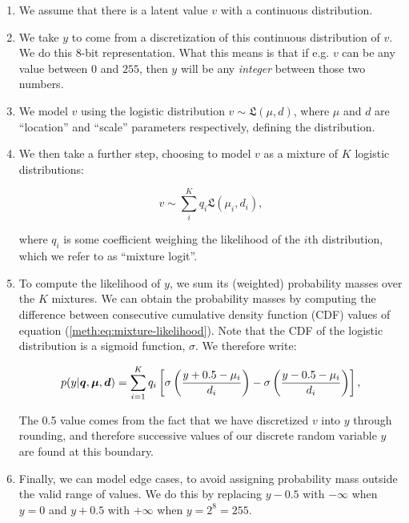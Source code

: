 \documentclass[../main.tex]{subfiles}
\begin{document}
\begin{enumerate}

	\item We assume that there is a latent value $v$ with a continuous distribution.

	\item We take $y$ to come from a discretization of this continuous distribution of $v$. We do this
	      8-bit representation. What this means is that if e.g. $v$ can be any value between $0$ and
	      $255$, then $y$ will be any \emph{integer} between those two numbers.

	\item We model $v$ using the logistic distribution $v \sim \mathfrak{L}(\mu, d)$, where $\mu$
	      and $d$ are ``location'' and ``scale'' parameters respectively, defining the distribution.

	\item We then take a further step, choosing to model $v$ as a mixture of $K$ logistic
	      distributions:

	      \begin{equation}\label{meth:eq:mixture-likelihood}
		      v \sim \sum_i^K q_i \mathfrak{L}(\mu_i, d_i),
	      \end{equation}

	      where $q_i$ is some coefficient weighing the likelihood of the $i$th distribution, which we
	      refer to as ``mixture logit''.

	\item To compute the likelihood of $y$, we sum its (weighted) probability masses over the $K$
	      mixtures. We can obtain the probability masses by computing the difference between consecutive
	      cumulative density function (CDF) values of equation (\ref{meth:eq:mixture-likelihood}). Note
	      that the CDF of the logistic distribution is a sigmoid function, $\sigma$. We therefore write:

	      \begin{equation}\label{meth:eq:computed-mixture-likelihood}
		      p(y | \bm q, \bm \mu, \bm d )  = \sum_{i=1}^K q_i
		      \left[\sigma\left(\frac{y + 0.5 - \mu_i}{d_i}\right) -
			      \sigma\left(\frac{y - 0.5 - \mu_i}{d_i}\right)\right],
	      \end{equation}

	      The 0.5 value comes from the fact that we have discretized $v$ into $y$ through rounding,
	      and therefore successive values of our discrete random variable $y$ are found at this
	      boundary.

	\item Finally, we can model edge cases, to avoid assigning probability mass outside the valid
	      range of values. We do this by replacing $y - 0.5$ with $-\infty$ when $y=0$ and $y + 0.5$ with
	      $+\infty$ when $y = 2^8 = 255$.

\end{enumerate}
\end{document}
